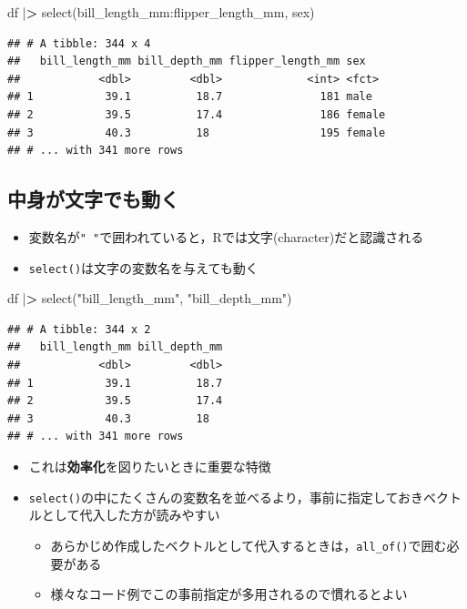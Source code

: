 \documentclass[
  xelatex,ja=standard, b5paper]{bxjsbook}
\newenvironment{Shaded}{\begin{snugshade}}{\end{snugshade}}
\newcommand{\ErrorTok}[1]{\textcolor[rgb]{0.64,0.00,0.00}{\textbf{#1}}}
\newcommand{\FunctionTok}[1]{\textcolor[rgb]{0.00,0.00,0.00}{#1}}
\newcommand{\NormalTok}[1]{#1}
\newcommand{\SpecialCharTok}[1]{\textcolor[rgb]{0.00,0.00,0.00}{#1}}
\newcommand{\StringTok}[1]{\textcolor[rgb]{0.31,0.60,0.02}{#1}}
\providecommand{\tightlist}{%
  \setlength{\itemsep}{0pt}\setlength{\parskip}{0pt}}
\begin{document}
\begin{Shaded}
\begin{Highlighting}[]
\NormalTok{df }\SpecialCharTok{|}\ErrorTok{\textgreater{}} 
  \FunctionTok{select}\NormalTok{(bill\_length\_mm}\SpecialCharTok{:}\NormalTok{flipper\_length\_mm, sex)}
\end{Highlighting}
\end{Shaded}

\begin{verbatim}
## # A tibble: 344 x 4
##   bill_length_mm bill_depth_mm flipper_length_mm sex   
##            <dbl>         <dbl>             <int> <fct> 
## 1           39.1          18.7               181 male  
## 2           39.5          17.4               186 female
## 3           40.3          18                 195 female
## # ... with 341 more rows
\end{verbatim}

\hypertarget{select-cha}{%
\subsection{中身が文字でも動く}\label{select-cha}}

\begin{itemize}
\tightlist
\item
  変数名が\texttt{"\ "}で囲われていると，Rでは文字(character)だと認識される
\item
  \texttt{select()}は文字の変数名を与えても動く
\end{itemize}

\begin{Shaded}
\begin{Highlighting}[]
\NormalTok{df }\SpecialCharTok{|}\ErrorTok{\textgreater{}} 
  \FunctionTok{select}\NormalTok{(}\StringTok{"bill\_length\_mm"}\NormalTok{, }\StringTok{"bill\_depth\_mm"}\NormalTok{)}
\end{Highlighting}
\end{Shaded}

\begin{verbatim}
## # A tibble: 344 x 2
##   bill_length_mm bill_depth_mm
##            <dbl>         <dbl>
## 1           39.1          18.7
## 2           39.5          17.4
## 3           40.3          18  
## # ... with 341 more rows
\end{verbatim}

\begin{itemize}
\tightlist
\item
  これは\textbf{効率化}を図りたいときに重要な特徴
\item
  \texttt{select()}の中にたくさんの変数名を並べるより，事前に指定しておきベクトルとして代入した方が読みやすい

  \begin{itemize}
  \tightlist
  \item
    あらかじめ作成したベクトルとして代入するときは，\texttt{all\_of()}で囲む必要がある
  \item
    様々なコード例でこの事前指定が多用されるので慣れるとよい
  \end{itemize}
\end{itemize}
\end{document}
